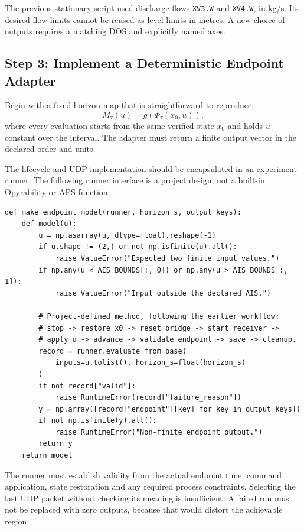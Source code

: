 \documentclass[11pt, letterpaper]{article}
\begin{document}
The previous stationary script used discharge flows \texttt{XV3.W} and \texttt{XV4.W}, in kg/s. Its desired flow limits cannot be reused as level limits in metres. A new choice of outputs requires a matching DOS and explicitly named axes.

\subsection{Step 3: Implement a Deterministic Endpoint Adapter}
Begin with a fixed-horizon map that is straightforward to reproduce:
\begin{equation}
M_{\tau}(u)=g\!\left(\Phi_{\tau}(x_0,u)\right),
\end{equation}
where every evaluation starts from the same verified state $x_0$ and holds $u$ constant over the interval. The adapter must return a finite output vector in the declared order and units.

The lifecycle and UDP implementation should be encapsulated in an experiment runner. The following runner interface is a project design, not a built-in Opyrability or APS function.

\begin{lstlisting}[style=pythonstyle,caption={Adapter contract; runner methods must be implemented in the project}]
def make_endpoint_model(runner, horizon_s, output_keys):
    def model(u):
        u = np.asarray(u, dtype=float).reshape(-1)
        if u.shape != (2,) or not np.isfinite(u).all():
            raise ValueError("Expected two finite input values.")
        if np.any(u < AIS_BOUNDS[:, 0]) or np.any(u > AIS_BOUNDS[:, 1]):
            raise ValueError("Input outside the declared AIS.")

        # Project-defined method, following the earlier workflow:
        # stop -> restore x0 -> reset bridge -> start receiver ->
        # apply u -> advance -> validate endpoint -> save -> cleanup.
        record = runner.evaluate_from_base(
            inputs=u.tolist(), horizon_s=float(horizon_s)
        )
        if not record["valid"]:
            raise RuntimeError(record["failure_reason"])
        y = np.array([record["endpoint"][key] for key in output_keys])
        if not np.isfinite(y).all():
            raise RuntimeError("Non-finite endpoint output.")
        return y
    return model
\end{lstlisting}

The runner must establish validity from the actual endpoint time, command application, state restoration and any required process constraints. Selecting the last UDP packet without checking its meaning is insufficient. A failed run must not be replaced with zero outputs, because that would distort the achievable region.
\end{document}
